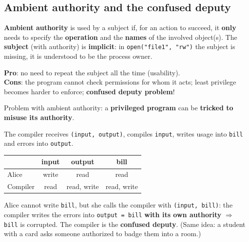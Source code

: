 \subsection{Ambient authority and the confused deputy}

\begin{defnbox}[title=Ambient authority]
\textbf{Ambient authority} is used by a subject if, for an action to succeed, it
\textbf{only} needs to specify the \textbf{operation} and the \textbf{names} of the
involved object(s). The \textbf{subject} (with authority) is \textbf{implicit}:
in \texttt{open("file1", "rw")} the subject is missing, it is understood to be the
process owner.
\end{defnbox}

\begin{propbox}[title=Ambient authority: pros and cons]
\textbf{Pro}: no need to repeat the subject all the time (usability). \\
\textbf{Cons}: the program cannot check permissions for whom it acts; least privilege
becomes harder to enforce; \textbf{confused deputy problem}!
\end{propbox}

\begin{defnbox}[title=Confused deputy problem]
Problem with ambient authority: a \textbf{privileged program} can be \textbf{tricked to
misuse its authority}.
\end{defnbox}

\begin{exbox}[title=Pay-per-use compiler]
The compiler receives \texttt{(input, output)}, compiles \texttt{input}, writes usage
into \texttt{bill} and errors into \texttt{output}.
\begin{center}
\begin{tabular}{l|c|c|c}
         & input & output      & bill        \\ \hline
Alice    & write & read        & read        \\
Compiler & read  & read, write & read, write
\end{tabular}
\end{center}
Alice cannot write \texttt{bill}, but she calls the compiler with
\texttt{(input, bill)}: the compiler writes the errors into \texttt{output = bill}
\textbf{with its own authority} $\Rightarrow$ \texttt{bill} is corrupted. The compiler
is the \textbf{confused deputy}. (Same idea: a student with a card asks someone
authorized to badge them into a room.)
\end{exbox}

